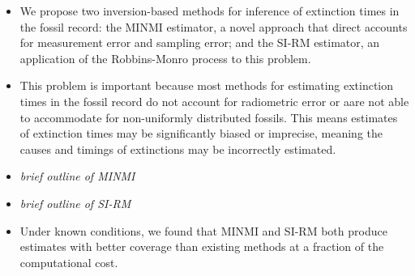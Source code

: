 

\begin{itemize}
    \item We propose two inversion-based methods for inference of extinction times in the fossil record: the MINMI estimator, a novel approach that direct accounts for measurement error and sampling error; and the SI-RM estimator, an application of the Robbins-Monro process to this problem.
    \item This problem is important because most methods for estimating extinction times in the fossil record do not account for radiometric error or aare not able to accommodate for non-uniformly distributed fossils. This means estimates of extinction times may be significantly biased or imprecise, meaning the causes and timings of extinctions may be incorrectly estimated.
    \item \textit{brief outline of MINMI}
    \item \textit{brief outline of SI-RM}
    \item Under known conditions, we found that MINMI and SI-RM both produce estimates with better coverage than existing methods at a fraction of the computational cost.
\end{itemize}